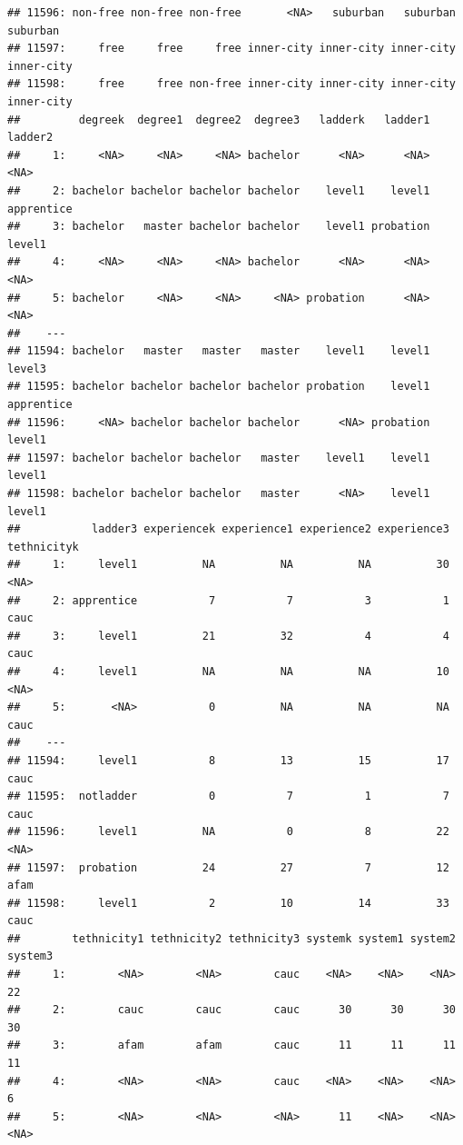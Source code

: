 \documentclass[]{book}
\begin{document}
\begin{verbatim}
## 11596: non-free non-free non-free       <NA>   suburban   suburban   suburban
## 11597:     free     free     free inner-city inner-city inner-city inner-city
## 11598:     free     free non-free inner-city inner-city inner-city inner-city
##         degreek  degree1  degree2  degree3   ladderk   ladder1    ladder2
##     1:     <NA>     <NA>     <NA> bachelor      <NA>      <NA>       <NA>
##     2: bachelor bachelor bachelor bachelor    level1    level1 apprentice
##     3: bachelor   master bachelor bachelor    level1 probation     level1
##     4:     <NA>     <NA>     <NA> bachelor      <NA>      <NA>       <NA>
##     5: bachelor     <NA>     <NA>     <NA> probation      <NA>       <NA>
##    ---                                                                   
## 11594: bachelor   master   master   master    level1    level1     level3
## 11595: bachelor bachelor bachelor bachelor probation    level1 apprentice
## 11596:     <NA> bachelor bachelor bachelor      <NA> probation     level1
## 11597: bachelor bachelor bachelor   master    level1    level1     level1
## 11598: bachelor bachelor bachelor   master      <NA>    level1     level1
##           ladder3 experiencek experience1 experience2 experience3 tethnicityk
##     1:     level1          NA          NA          NA          30        <NA>
##     2: apprentice           7           7           3           1        cauc
##     3:     level1          21          32           4           4        cauc
##     4:     level1          NA          NA          NA          10        <NA>
##     5:       <NA>           0          NA          NA          NA        cauc
##    ---                                                                       
## 11594:     level1           8          13          15          17        cauc
## 11595:  notladder           0           7           1           7        cauc
## 11596:     level1          NA           0           8          22        <NA>
## 11597:  probation          24          27           7          12        afam
## 11598:     level1           2          10          14          33        cauc
##        tethnicity1 tethnicity2 tethnicity3 systemk system1 system2 system3
##     1:        <NA>        <NA>        cauc    <NA>    <NA>    <NA>      22
##     2:        cauc        cauc        cauc      30      30      30      30
##     3:        afam        afam        cauc      11      11      11      11
##     4:        <NA>        <NA>        cauc    <NA>    <NA>    <NA>       6
##     5:        <NA>        <NA>        <NA>      11    <NA>    <NA>    <NA>

\end{verbatim}
\end{document}
